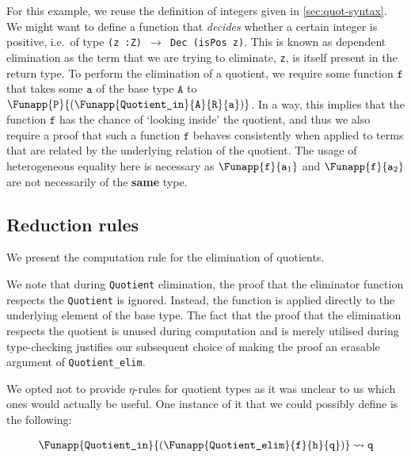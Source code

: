 \documentclass[12pt,twoside,maitrise]{dms}
\theoremstyle{definition}
\numberwithin{equation}{section}
\numberwithin{table}{chapter}
\numberwithin{figure}{chapter}
\newcommand\id[1] {\texttt{#1}}
\newcommand\fn[1] {\texttt{#1}}
\begin{document}
For this example, we reuse the definition of integers given in
\autoref{sec:quot-syntax}. We might want to define a function that
\emph{decides} whether a certain integer is positive, i.e.\ of type \fn{(z
  :\@ Z) $\rightarrow$ Dec (isPos z)}. This is known as dependent
elimination as the term that we are trying to eliminate, \id{z}, is itself
present in the return type. To perform the elimination of a quotient, we require
some function $\id{f}$ that takes some $\id{a}$ of the base type $\id{A}$ to
$\Funapp{\id{P}}{(\Funapp{\id{Quotient\_in}}{\id{A}}{\id{R}}{\id{a}})}$. In a
way, this implies that the function $\id{f}$ has the chance of `looking inside'
the quotient, and thus we also require a proof that such a function $\id{f}$
behaves consistently when applied to terms that are related by the underlying
relation of the quotient. The usage of heterogeneous equality here is necessary
as $\Funapp{\id{f}}{\id{a}_1}$ and $\Funapp{\id{f}}{\id{a}_2}$ are not
necessarily of the \textbf{same} type.

\subsection{Reduction rules}\label{quot-red-rules}
We present the computation rule for the elimination of quotients.

\begin{prooftree*}
   \infer0{\Funapp{\id{Quotient\_elim}}{\id{f}}{\id{p}}{(\Funapp{\id{Quotient\_in}}{\id{R}}{\id{a}})}
             \rightsquigarrow \Funapp{\id{f}}{\id{a}}}
\end{prooftree*}

We note that during \id{Quotient} elimination, the proof that the eliminator
function respects the \id{Quotient} is ignored. Instead, the function is applied
directly to the underlying element of the base type. The fact that the proof
that the elimination respects the quotient is unused during computation and is
merely utilised during type-checking justifies our subsequent choice of making
the proof an erasable argument of \id{Quotient\_elim}.

We opted not to provide $\eta$-rules for quotient types as it was unclear to us
which ones would actually be useful. One instance of it that we could possibly
define is the following:

\begin{align*}
  & \Funapp{\id{Quotient\_in}}{(\Funapp{\fn{Quotient\_elim}}{\id{f}}{\id{h}}{\id{q}})} \rightsquigarrow{} \id{q} \\
\end{align*}
\end{document}
